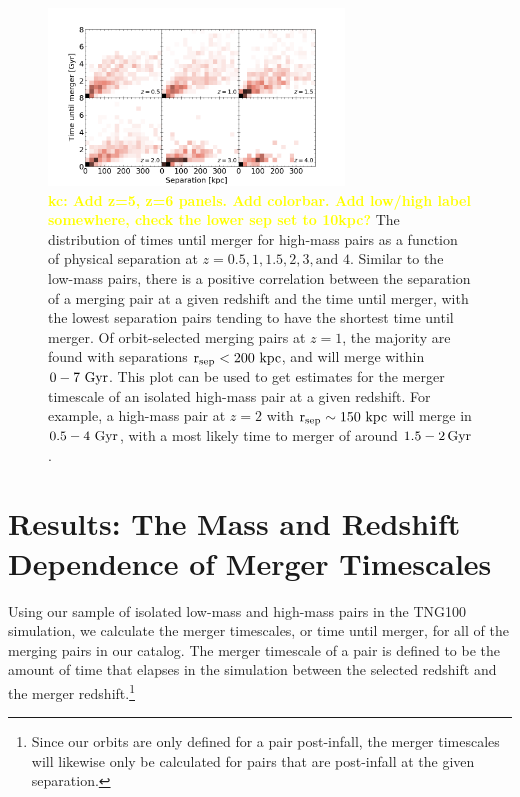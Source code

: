 \documentclass[twocolumn,linenumbers]{aastex631}
\newcommand{\kc}[1]{\textcolor{yellow}{\textbf{kc: #1}} }
\begin{document}
\begin{figure}[htb]
    \begin{center}
    \includegraphics[width=0.7\textwidth]{plots/bet-on-it/3_Timevssephigh-2d.png}
    \caption{\kc{Add z=5, z=6 panels. Add colorbar. Add low/high label somewhere, check the lower sep set to 10kpc?} The distribution of times until merger for high-mass pairs as a function of physical separation at $z=0.5,1,1.5,2,3,\mbox{and }4$.
    Similar to the low-mass pairs, there is a positive correlation between the separation of a merging pair at a given redshift and the time until merger, with the lowest separation pairs tending to have the shortest time until merger.
    Of orbit-selected merging pairs at $z=1$, the majority are found with separations $\rm r_{sep}<200\,\mathrm{\,kpc}$, and will merge within $0-7\, \mathrm{\,Gyr}$. 
    This plot can be used to get estimates for the merger timescale of an isolated high-mass pair at a given redshift. 
    For example, a high-mass pair at $z=2$ with $\rm r_{sep}\sim 150\,\mathrm{\,kpc}$ will merge in $0.5-4\,\mathrm{\,Gyr}$, with a most likely time to merger of around $1.5-2\mathrm{\,Gyr}$.
    }
    \label{fig:timevssep-high}
    \end{center}
\end{figure}

\section{Results: The Mass and Redshift Dependence of Merger Timescales}
    Using our sample of isolated low-mass and high-mass pairs in the TNG100 simulation, we calculate the merger timescales, or time until merger, for all of the merging pairs in our catalog. 
    The merger timescale of a pair is defined to be the amount of time that elapses in the simulation between the selected redshift and the merger redshift.\footnote{Since our orbits are only defined for a pair post-infall, the merger timescales will likewise only be calculated for pairs that are post-infall at the given separation.}
    
\end{document}
